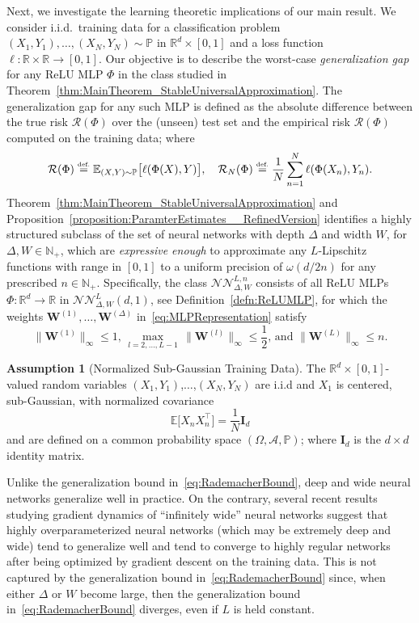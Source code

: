 \documentclass{article}
\numberwithin{equation}{section}
\theoremstyle{definition}
\newtheorem{assumption}{Assumption}[section]
\newcommand{\eqdef}{\ensuremath{\stackrel{\mbox{\upshape\tiny def.}}{=}}}
\begin{document}
\label{s:Main__ss:Consequences___LearningTheory_I}
Next, we investigate the learning theoretic implications of our main result.  
We consider i.i.d.\ training data for a classification problem $(X_1,Y_1),\dots,(X_N,Y_N)\sim \mathbb{P}$ in $\mathbb{R}^d\times [0,1]$ and a loss function $\ell:\mathbb{R}\times \mathbb{R}\to[0,1]$.  Our objective is to describe the worst-case \textit{generalization gap} for any ReLU MLP $\Phi$ in the class studied in Theorem~\ref{thm:MainTheorem_StableUniversalApproximation}.  The generalization gap for any such MLP is defined as the absolute difference between the true risk $\mathcal{R}(\Phi)$ over the (unseen) test set and the empirical risk $\mathcal{R}(\Phi)$ computed on the training data; where
\begin{equation*}
    \mathcal{R}(\Phi) \eqdef \mathbb{E}_{(X,Y)\sim \mathbb{P}}\big[\ell(\Phi(X),Y)\big]
    ,\quad
    \mathcal{R}_N(\Phi) \eqdef \frac1{N}\sum_{n=1}^N\ell(\Phi(X_n),Y_n)
.
\end{equation*}
Theorem~\ref{thm:MainTheorem_StableUniversalApproximation} and Proposition~\ref{proposition:ParamterEstimates__RefinedVersion} identifies a highly structured subclass of the set of neural networks with depth $\Delta$ and width $W$, for $\Delta,W\in \mathbb{N}_+$, which are \textit{expressive enough} to approximate any $L$-Lipschitz functions with range in $[0,1]$ to a uniform precision of $\omega(d/2n)$ for any prescribed $n\in \mathbb{N}_+$.  Specifically, the class $\mathcal{NN}_{\Delta,W}^{L,n}$ consists of all ReLU MLPs $\Phi:\mathbb{R}^d\to \mathbb{R}$ in $\mathcal{NN}_{\Delta,W}^{L}(d,1)$, see Definition~\ref{defn:ReLUMLP}, for which the weights $\mathbf{W}^{(1)},\dots,\mathbf{W}^{(\Delta)}$ in~\eqref{eq:MLPRepresentation} satisfy
\begin{equation}
\label{eq:weight_constants}
        \|\mathbf{W}^{(1)}\|_{\infty}\le 1
    ,\,
        \max_{l=2,\dots,L-1}\, \|\mathbf{W}^{(l)}\|_{\infty}\le \frac{1}{2}
    \mbox{, and }
        \|\mathbf{W}^{(L)}\|_{\infty} \le n 
.
\end{equation}
\begin{assumption}[Normalized Sub-Gaussian Training Data]
\label{ass:NormalizedData}
The $\mathbb{R}^d\times [0,1]$-valued random variables $(X_1,Y_1)$,$\dots$,$(X_N,Y_N)$ are i.i.d and $X_1$ is centered, sub-Gaussian, with normalized covariance
\[
    \mathbb{E}\big[X_nX_n^{\top}\big] = \frac1{N}\mathbf{I}_d
\]
and are defined on a common probability space $(\Omega,\mathcal{A},\mathbb{P})$; where $\mathbf{I}_d$ is the $d\times d$ identity matrix.
\end{assumption}
Unlike the generalization bound in~\eqref{eq:RademacherBound}, deep and wide neural networks generalize well in practice.  On the contrary, several recent results studying gradient dynamics of ``infinitely wide'' neural networks suggest that highly overparameterized neural networks (which may be extremely deep and wide) tend to generalize well and tend to converge to highly regular networks after being optimized by gradient descent on the training data.  This is not captured by the generalization bound in~\eqref{eq:RademacherBound} since, when either $\Delta$ or $W$ become large, then the generalization bound in~\eqref{eq:RademacherBound} diverges, even if $L$ is held constant.  
\end{document}
